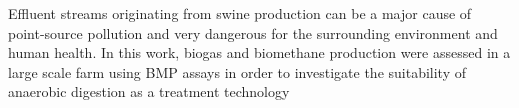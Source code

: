Effluent streams originating from swine production can be a major cause of point-source pollution and very dangerous for the surrounding environment and human health. In this work, biogas and biomethane production were assessed in a large scale farm using BMP assays in order to investigate the suitability of anaerobic digestion as a treatment technology
